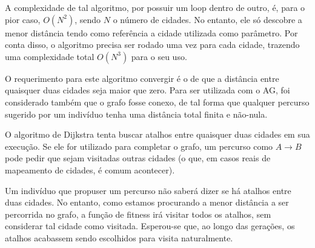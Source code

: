 A complexidade de tal algoritmo, por possuir um loop dentro de outro, é, para o pior caso, $O(N^2)$, sendo $N$ o número de cidades. No entanto, ele só descobre a menor distância tendo como referência a cidade utilizada como parâmetro. Por conta disso, o algoritmo precisa ser rodado uma vez para cada cidade, trazendo uma complexidade total $O(N^3)$ para o seu uso.

O requerimento para este algoritmo convergir é o de que a distância entre quaisquer duas cidades seja maior que zero. Para ser utilizada com o AG, foi considerado também que o grafo fosse conexo, de tal forma que qualquer percurso sugerido por um indivíduo tenha uma distância total finita e não-nula.

O algoritmo de Dijkstra tenta buscar atalhos entre quaisquer duas cidades em sua execução. Se ele for utilizado para completar o grafo, um percurso como $A \rightarrow B$ pode pedir que sejam visitadas outras cidades (o que, em casos reais de mapeamento de cidades, é comum acontecer).

Um indivíduo que propuser um percurso não saberá dizer se há atalhos entre duas cidades. No entanto, como estamos procurando a menor distância a ser percorrida no grafo, a função de fitness irá visitar todos os atalhos, sem considerar tal cidade como visitada. Esperou-se que, ao longo das gerações, os atalhos acabassem sendo escolhidos para visita naturalmente.

